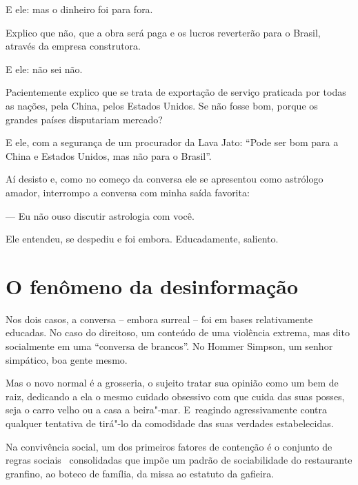 

E ele: mas o dinheiro foi para fora.

 

Explico que não, que a obra será paga e os lucros reverterão para o
Brasil, através da empresa construtora.~

 

E ele: não sei não.~

 

Pacientemente explico que se trata de exportação de serviço praticada
por todas as nações, pela China, pelos Estados Unidos. Se não fosse bom,
porque os grandes países disputariam mercado?

 

E ele, com a segurança de um procurador da Lava Jato: ``Pode ser bom
para a China e Estados Unidos, mas não para o Brasil''.

 

Aí desisto e, como no começo da conversa ele se apresentou como
astrólogo amador, interrompo a conversa com minha saída favorita:

 

— Eu não ouso discutir astrologia com você.

 

Ele entendeu, se despediu e foi embora. Educadamente, saliento.

 

\section{O fenômeno da desinformação}

 

Nos dois casos, a conversa -- embora surreal -- foi em bases
relativamente educadas. No caso do direitoso, um conteúdo de uma
violência extrema, mas dito socialmente em uma ``conversa de brancos''.
No Hommer Simpson, um senhor simpático, boa gente mesmo.

 

Mas o novo normal é a grosseria, o sujeito tratar sua opinião como um
bem de raiz, dedicando a ela o mesmo cuidado obsessivo com que cuida das
suas posses, seja o carro velho ou a casa a beira"-mar. E~reagindo
agressivamente contra qualquer tentativa de tirá"-lo da comodidade das
suas verdades estabelecidas.

 

Na convivência social, um dos primeiros fatores de contenção é o
conjunto de regras sociais ~consolidadas que impõe um padrão de
sociabilidade do restaurante granfino, ao boteco de família, da missa ao
estatuto da gafieira.

